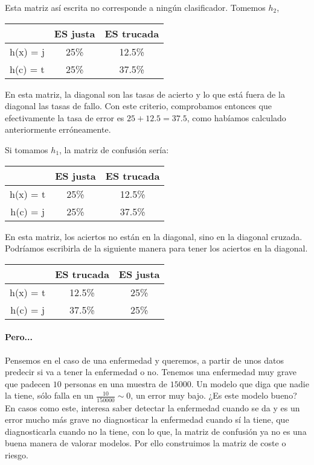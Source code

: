 \documentclass{apuntes}
\begin{document}
Esta matriz así escrita no corresponde a ningún clasificador. Tomemos $h_2$,

\begin{center}
\begin{tabular}{c|cc}
 & ES justa & ES trucada \\\hline
 h(x) = j & 25\% & 12.5\%\\
 h(c) = t & 25\% & 37.5\%
\end{tabular}
\end{center}

En esta matriz, la diagonal son las tasas de acierto y lo que está fuera de la diagonal las tasas de fallo. Con este criterio, comprobamos entonces que efectivamente la tasa de error es $25+12.5 = 37.5$, como habíamos calculado anteriormente erróneamente.


Si tomamos $h_1$, la matriz de confusión sería:

\begin{center}
\begin{tabular}{c|cc}
 & ES justa & ES trucada \\\hline
 h(x) = t & 25\% & 12.5\%\\
 h(c) = j & 25\% & 37.5\%
\end{tabular}
\end{center}

En esta matriz, los aciertos no están en la diagonal, sino en la diagonal cruzada. Podríamos escribirla de la siguiente manera para tener los aciertos en la diagonal.

\begin{center}
\begin{tabular}{c|cc}
 & ES trucada & ES justa \\\hline
 h(x) = t & 12.5\% & 25\%\\
 h(c) = j & 37.5\% & 25\%
\end{tabular}
\end{center}


\paragraph{Pero...}

Pensemos en el caso de una enfermedad y queremos, a partir de unos datos predecir si va a tener la enfermedad o no. Tenemos una enfermedad muy grave que padecen $10$ personas en una muestra de $15000$. Un modelo que diga que nadie la tiene, sólo falla en un $\frac{10}{150000} \sim 0$, un error muy bajo. ¿Es este modelo bueno? En casos como este, interesa saber detectar la enfermedad cuando se da y es un error mucho más grave no diagnosticar la enfermedad cuando sí la tiene, que diagnosticarla cuando no la tiene, con lo que, la matriz de confusión ya no es una buena manera de valorar modelos. Por ello construimos la matriz de coste o riesgo.
\end{document}
